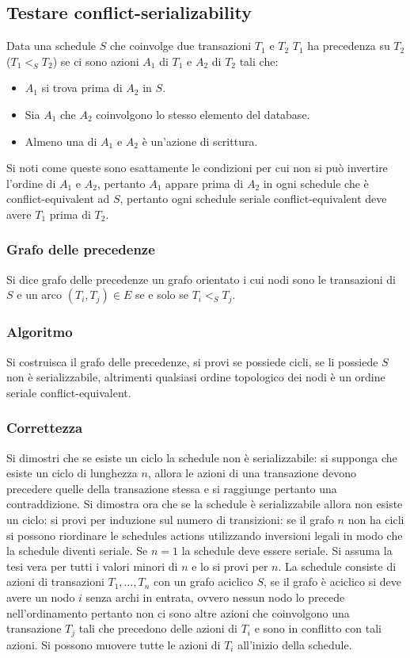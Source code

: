 \subsection{Testare conflict-serializability}
Data una schedule $S$ che coinvolge due transazioni $T_1$ e $T_2$ $T_1$ ha precedenza su $T_2$ ($T_1<_S T_2$) se ci sono azioni $A_1$ di $T_1$ e $A_2$ di $T_2$ tali che:
\begin{itemize}
\item $A_1$ si trova prima di $A_2$ in $S$.
\item Sia $A_1$ che $A_2$ coinvolgono lo stesso elemento del database.
\item Almeno una di $A_1$ e $A_2$ \`e un'azione di scrittura.
\end{itemize}
Si noti come queste sono esattamente le condizioni per cui non si pu\`o invertire l'ordine di $A_1$ e $A_2$, pertanto $A_1$ appare prima di $A_2$ in ogni schedule che \`e conflict-equivalent ad $S$, pertanto 
ogni schedule seriale conflict-equivalent deve avere $T_1$ prima di $T_2$. 
\subsubsection{Grafo delle precedenze}
Si dice grafo delle precedenze un grafo orientato i cui nodi sono le transazioni di $S$ e un arco $(T_i, T_j)\in E$ se e solo se $T_i<_S T_j$. 
\subsubsection{Algoritmo}
Si costruisca il grafo delle precedenze, si provi se possiede cicli, se li possiede $S$ non \`e serializzabile, altrimenti qualsiasi ordine topologico dei nodi \`e un ordine seriale conflict-equivalent.
\subsubsection{Correttezza}
Si dimostri che se esiste un ciclo la schedule non \`e serializzabile: si supponga che esiste un ciclo di lunghezza $n$, allora le azioni di una transazione devono precedere quelle della transazione stessa e si
raggiunge pertanto una contraddizione. Si dimostra ora che se la schedule \`e serializzabile allora non esiste un ciclo: si provi per induzione sul numero di transizioni: se il grafo $n$ non ha cicli si possono 
riordinare le schedules actions utilizzando inversioni legali in modo che la schedule diventi seriale. Se $n=1$ la schedule deve essere seriale. Si assuma la tesi vera per tutti i valori minori di $n$ e lo si provi per 
$n$. La schedule consiste di azioni di transazioni $T_1, \dots, T_n$ con un grafo aciclico $S$, se il grafo \`e aciclico si deve avere un nodo $i$ senza archi in entrata, ovvero nessun nodo lo precede 
nell'ordinamento pertanto non ci sono altre azioni che coinvolgono una transazione $T_j$ tali che precedono delle azioni di $T_i$ e sono in conflitto con tali azioni. Si possono muovere tutte le azioni di $T_i$ 
all'inizio della schedule. 
